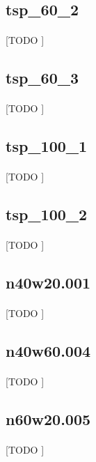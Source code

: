 \documentclass[spanish]{article}
\begin{document}
		\subsection{tsp\_60\_2}

			\paragraph{}
			[TODO ]

		\subsection{tsp\_60\_3}

			\paragraph{}
			[TODO ]

		\subsection{tsp\_100\_1}

			\paragraph{}
			[TODO ]

		\subsection{tsp\_100\_2}

			\paragraph{}
			[TODO ]

		\subsection{n40w20.001}

			\paragraph{}
			[TODO ]

		\subsection{n40w60.004}

			\paragraph{}
			[TODO ]

		\subsection{n60w20.005}

			\paragraph{}
			[TODO ]


	\nocite{subject:mio}
	\nocite{garciparedes:mosel-examples}
	
  
\end{document}

